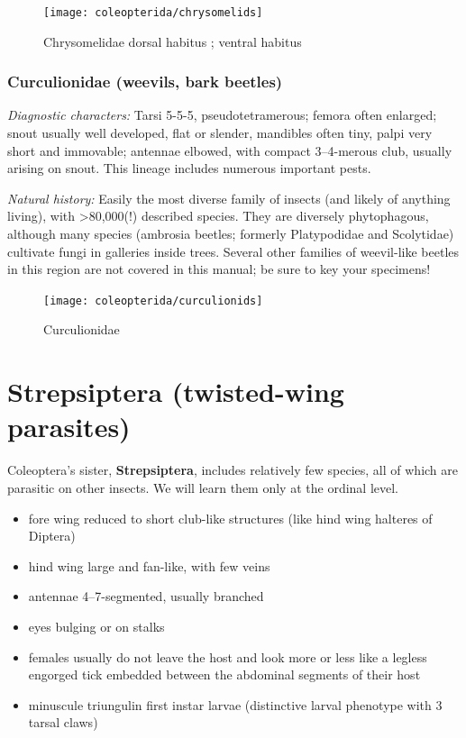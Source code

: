 \begin{figure}[ht!]
  \centering
    \texttt{[image: coleopterida/chrysomelids]}
  \caption{Chrysomelidae dorsal habitus \cite[redrawn from][Plate 61, Figs. 18, 24, 33]{bhlitem240513beetles}; ventral habitus \citep[modified from][Plate 1, Fig. 1]{bhlitem35775}}
  \label{fig:chrysomelids}
\end{figure}

\subsubsection{Curculionidae (weevils, bark beetles)}
\noindent{}\textit{Diagnostic characters:} Tarsi 5-5-5, pseudotetramerous; femora often enlarged; snout usually well developed, flat or slender, mandibles often tiny, palpi very short and immovable; antennae elbowed, with compact 3--4-merous club, usually arising on snout. This lineage includes numerous important pests.\vspace{3mm}

\noindent{}\textit{Natural history:} Easily the most diverse family of insects (and likely of anything living), with \textgreater80,000(!) described species. They are diversely phytophagous, although many species (ambrosia beetles; formerly Platypodidae and Scolytidae) cultivate fungi in galleries inside trees. Several other families of weevil-like beetles in this region are not covered in this manual; be sure to key your specimens!

\begin{figure}[ht!]
  \centering
    \texttt{[image: coleopterida/curculionids]}
  \caption{Curculionidae \cite[redrawn from][Plate 67, Fig. 8; Plate 73, Fig. 7; Plate 71, Fig. 6]{bhlitem37317beetles}}
  \label{fig:curculionids}
\end{figure}

\FloatBarrier
\section{Strepsiptera (twisted-wing parasites)}
Coleoptera's sister, \textbf{Strepsiptera}, includes relatively few species, all of which are parasitic on other insects. We will learn them only at the ordinal level.
\begin{itemize}
\item fore wing reduced to short club-like structures (like hind wing halteres of Diptera)
\item hind wing large and fan-like, with few veins
\item antennae 4--7-segmented, usually branched
\item eyes bulging or on stalks
\item females usually do not leave the host and look more or less like a legless engorged tick embedded between the abdominal segments of their host
\item minuscule triungulin first instar larvae (distinctive larval phenotype with 3 tarsal claws)
\end{itemize}


